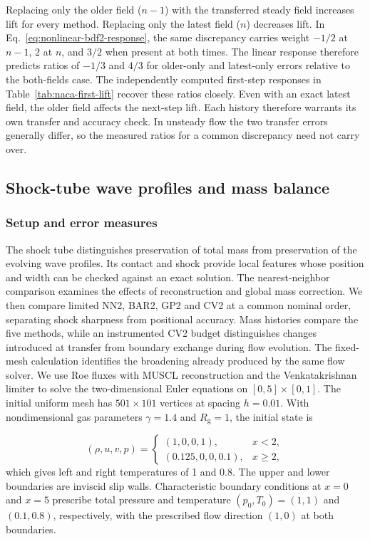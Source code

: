 \documentclass[a4paper,fleqn]{cas-sc}
\begin{document}
Replacing only the older field ($n-1$) with the transferred steady field increases lift for every method. Replacing only the latest field ($n$) decreases lift. In Eq.~\eqref{eq:nonlinear-bdf2-response}, the same discrepancy carries weight $-1/2$ at $n-1$, $2$ at $n$, and $3/2$ when present at both times. The linear response therefore predicts ratios of $-1/3$ and $4/3$ for older-only and latest-only errors relative to the both-fields case. The independently computed first-step responses in Table~\ref{tab:naca-first-lift} recover these ratios closely. Even with an exact latest field, the older field affects the next-step lift. Each history therefore warrants its own transfer and accuracy check. In unsteady flow the two transfer errors generally differ, so the measured ratios for a common discrepancy need not carry over.

\subsection{Shock-tube wave profiles and mass balance}

\subsubsection{Setup and error measures}
\label{sec:riemann-methodology}

The shock tube distinguishes preservation of total mass from preservation of the evolving wave profiles. Its contact and shock provide local features whose position and width can be checked against an exact solution. The nearest-neighbor comparison examines the effects of reconstruction and global mass correction. We then compare limited NN2, BAR2, GP2 and CV2 at a common nominal order, separating shock sharpness from positional accuracy. Mass histories compare the five methods, while an instrumented CV2 budget distinguishes changes introduced at transfer from boundary exchange during flow evolution. The fixed-mesh calculation identifies the broadening already produced by the same flow solver. We use Roe fluxes with MUSCL reconstruction and the Venkatakrishnan limiter to solve the two-dimensional Euler equations on $[0,5]\times[0,1]$. The initial uniform mesh has $501\times101$ vertices at spacing $h=0.01$. With nondimensional gas parameters $\gamma=1.4$ and $R_{\mathrm g}=1$, the initial state is

\begin{equation}
 (\rho,u,v,p)=
 \begin{cases}
 (1,0,0,1), & x<2,\\
 (0.125,0,0,0.1), & x\geq2,
 \end{cases}
 \label{eq:riemann-initial-state}
\end{equation}
which gives left and right temperatures of 1 and 0.8. The upper and lower boundaries are inviscid slip walls. Characteristic boundary conditions at $x=0$ and $x=5$ prescribe total pressure and temperature $(p_0,T_0)=(1,1)$ and $(0.1,0.8)$, respectively, with the prescribed flow direction $(1,0)$ at both boundaries.
\end{document}
